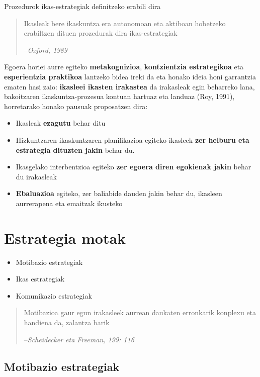 \documentclass[
]{book}
\providecommand{\tightlist}{%
  \setlength{\itemsep}{0pt}\setlength{\parskip}{0pt}}
\begin{document}
Prozedurok ikas-estrategiak definitzeko erabili dira

\begin{quote}
Ikasleak bere ikaskuntza era autonomoan eta aktiboan hobetzeko erabiltzen dituen prozedurak dira ikas-estrategiak

--\emph{Oxford, 1989}
\end{quote}

Egoera horiei aurre egiteko \textbf{metakognizioa}, \textbf{kontzientzia estrategikoa} eta \textbf{esperientzia praktikoa} lantzeko bidea ireki da eta honako ideia honi garrantzia ematen hasi zaio: \textbf{ikasleei ikasten irakastea} da irakasleak egin beharreko lana, bakoitzaren ikaskuntza-prozesua kontuan hartuaz eta landuaz (Roy, 1991), horretarako honako pausuak proposatzen dira:

\begin{itemize}
\tightlist
\item
  Ikasleak \textbf{ezagutu} behar ditu
\item
  Hizkuntzaren ikaskuntzaren planifikazioa egiteko ikasleek \textbf{zer helburu eta estrategia dituzten jakin} behar du.
\item
  Ikasgelako interbentzioa egiteko \textbf{zer egoera diren egokienak jakin} behar du irakasleak
\item
  \textbf{Ebaluazioa} egiteko, zer baliabide dauden jakin behar du, ikasleen aurrerapena eta emaitzak ikusteko
\end{itemize}

\hypertarget{estrategia-motak}{%
\section{Estrategia motak}\label{estrategia-motak}}

\begin{itemize}
\tightlist
\item
  Motibazio estrategiak
\item
  Ikas estrategiak
\item
  Komunikazio estrategiak
\end{itemize}

\begin{quote}
Motibazioa gaur egun irakasleek aurrean daukaten erronkarik konplexu eta handiena da, zalantza barik

--\emph{Scheidecker eta Freeman, 199: 116}
\end{quote}

\hypertarget{motibazio-estrategiak}{%
\subsection{Motibazio estrategiak}\label{motibazio-estrategiak}}
\end{document}
